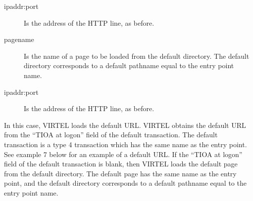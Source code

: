 \documentclass[letterpaper,10pt,english]{sphinxmanual}
\begin{document}
\begin{sphinxVerbatim}[commandchars=\\\{\}]
\end{sphinxVerbatim}
\begin{description}
\item[{ipaddr:port}] \leavevmode
Is the address of the HTTP line, as before.

\item[{pagename}] \leavevmode
Is the name of a page to be loaded from the default directory. The
default directory corresponds to a default pathname equal to the
entry point name.

\end{description}

\begin{sphinxVerbatim}[commandchars=\\\{\}]
\end{sphinxVerbatim}
\begin{description}
\item[{ipaddr:port}] \leavevmode
Is the address of the HTTP line, as before.

\end{description}

In this case, VIRTEL loads the default URL. VIRTEL obtains the default URL from the “TIOA at logon” field of the default transaction. The default transaction is a type 4 transaction which has the same name as the entry point. See example 7 below for an example of a default URL. If the “TIOA at logon” field of the default transaction is blank, then VIRTEL loads the default page from the default directory. The default page has the same name as the entry point, and the default directory corresponds to a default pathname equal to the entry point name.
\end{document}
